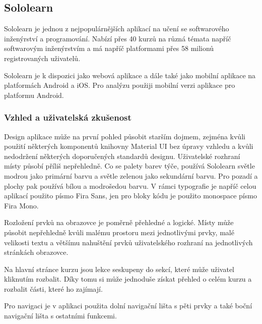 \subsection{Sololearn}

Sololearn je jednou z nejpopulárnějších aplikací na učení se softwarového inženýrství a programování. Nabízí přes 40 kurzů na různá témata napříč softwarovým inženýrstvím a má napříč platformami přes 58 milionů registrovaných uživatelů.

Sololearn je k dispozici jako webová aplikace a dále také jako mobilní aplikace na platformách Android a iOS. Pro analýzu použiji mobilní verzi aplikace pro platformu Android.

\subsubsection{Vzhled a uživatelská zkušenost}


Design aplikace může na první pohled působit starším dojmem, zejména kvůli použití některých komponentů knihovny Material UI bez úpravy vzhledu a kvůli nedodržení některých doporučených standardů designu. %
Uživatelské rozhraní místy působí příliš nepřehledně. Co se palety barev týče, používá Sololearn světle modrou jako primární barvu a světle zelenou jako sekundární barvu. Pro pozadí a plochy pak používá bílou a modrošedou barvu. V rámci typografie je napříč celou aplikací použito písmo Fira Sans, jen pro bloky kódu je použito monospace písmo Fira Mono.


Rozložení prvků na obrazovce je poměrně přehledné a logické. Místy může působit nepřehledně kvůli malému prostoru mezi jednotlivými prvky, malé velikosti textu a většímu nahuštění prvků uživatelského rozhraní na jednotlivých stránkách obrazovce.

Na hlavní stránce kurzu jsou lekce seskupeny do sekcí, které může uživatel kliknutím rozbalit. Díky tomu si může jednoduše získat přehled o celém kurzu a rozbalit části, které ho zajímají.


Pro navigaci je v aplikaci použita dolní navigační lišta s pěti prvky a také boční navigační lišta s ostatními funkcemi. 

